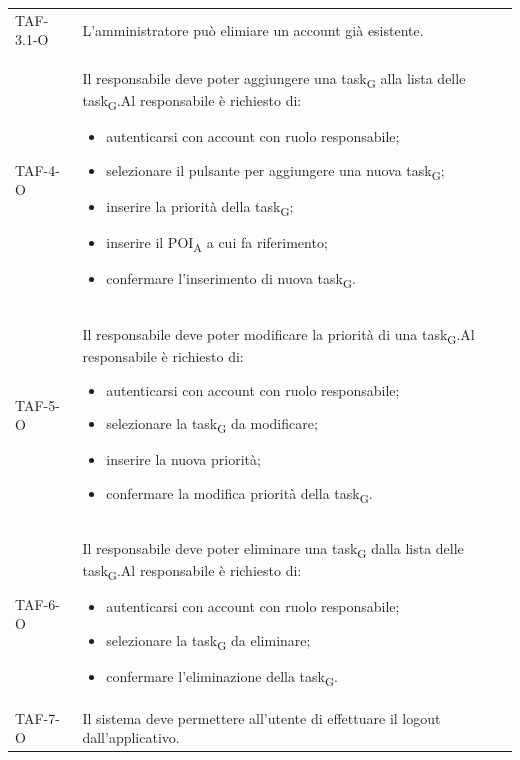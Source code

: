 \begin{longtable}{ >{\centering}p{} >{}p{}
		>{\centering}p{}}
	TAF-3.1-O & L'amministratore può elimiare un account già esistente. & 0\tabularnewline
	
	TAF-4-O & Il responsabile deve poter aggiungere una \gls{task}\textsubscript{G} alla lista delle \gls{task}\textsubscript{G}.\newline Al responsabile è richiesto di: \begin{itemize}\item autenticarsi con account con ruolo responsabile; \item selezionare il pulsante per aggiungere una nuova \gls{task}\textsubscript{G}; \item inserire la priorità della \gls{task}\textsubscript{G}; \item inserire il \acrshort{POI}\textsubscript{A} a cui fa riferimento; \item confermare l'inserimento di nuova \gls{task}\textsubscript{G}. \end{itemize} & 0\tabularnewline
	
	TAF-5-O & Il responsabile deve poter modificare la priorità di una \gls{task}\textsubscript{G}.\newline Al responsabile è richiesto di: \begin{itemize}\item autenticarsi con account con ruolo responsabile; \item selezionare la \gls{task}\textsubscript{G} da modificare; \item inserire la nuova priorità; \item confermare la modifica priorità della \gls{task}\textsubscript{G}. \end{itemize} & 0\tabularnewline
	
	TAF-6-O & Il responsabile deve poter eliminare una \gls{task}\textsubscript{G} dalla lista delle \gls{task}\textsubscript{G}.\newline Al responsabile è richiesto di: \begin{itemize} \item autenticarsi con account con ruolo responsabile; \item selezionare la \gls{task}\textsubscript{G} da eliminare; \item confermare l'eliminazione della \gls{task}\textsubscript{G}. \end{itemize} & 0\tabularnewline
	
	TAF-7-O & Il sistema deve permettere all'utente di effettuare il logout dall'applicativo. & 0\tabularnewline
	

\end{longtable}
